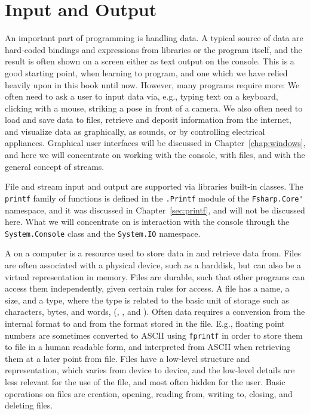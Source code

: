 \chapter{Input and Output}
\label{chap:IO}
An important part of programming is handling data. A typical source of data are hard-coded bindings and expressions from libraries or the program itself, and the result is often shown on a screen either as text output on the console. This is a good starting point, when learning to program, and one which we have relied heavily upon in this book until now. However, many programs require more: We often need to ask a user to input data via, e.g., typing text on a keyboard, clicking with a mouse, striking a pose in front of a camera. We also often need to load and save data to files, retrieve and deposit information from the internet, and visualize data as graphically, as sounds, or by controlling electrical appliances. Graphical user interfaces will be discussed in Chapter~\ref{chap:windows}, and here we will concentrate on working with the console, with files, and with the general concept of streams. 

File and stream input and output are supported via libraries built-in classes. The \lstinline!printf! family of functions is defined in the \lstinline!.Printf! module of the \lstinline!Fsharp.Core'! namespace, and it was discussed in Chapter~\ref{sec:printf}, and will not be discussed here. What we will concentrate on is interaction with the console through the \lstinline!System.Console! class and the \lstinline!System.IO! namespace.

A  on a computer is a resource used to store data in and retrieve data from. Files are often associated with a physical device, such as a harddisk, but can also be a virtual representation in memory. Files are durable, such that other programs can access them independently, given certain rules for access. A file has a name, a size, and a type, where the type is related to the basic unit of storage such as characters, bytes, and words, (, , and ). Often data requires a conversion from the internal format to and from the format stored in the file. E.g., floating point numbers are sometimes converted to ASCII using \lstinline!fprintf! in order to store them to file in a human readable form, and interpreted from ASCII when retrieving them at a later point from file. Files have a low-level structure and representation, which varies from device to device, and the low-level details are less relevant for the use of the file, and most often hidden for the user. Basic operations on files are creation, opening, reading from, writing to, closing, and deleting files.

